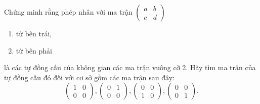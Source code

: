 \begin{exercise}
    Chứng minh rằng phép nhân với ma trận $\begin{pmatrix}a & b \\ c & d\end{pmatrix}$
    \begin{enumerate}[label = (\alph*)]
        \item từ bên trái,
        \item từ bên phải
    \end{enumerate}
    
    là các tự đồng cấu của không gian các ma trận vuông cỡ 2. Hãy tìm ma trận của tự đồng cấu đó đối với cơ sở gồm các ma trận sau đây:
    \[
        \begin{pmatrix}
            1 & 0 \\
            0 & 0
        \end{pmatrix},
        \begin{pmatrix}
            0 & 1 \\
            0 & 0
        \end{pmatrix},
        \begin{pmatrix}
            0 & 0 \\
            1 & 0
        \end{pmatrix},
        \begin{pmatrix}
            0 & 0 \\
            0 & 1
        \end{pmatrix}.
    \]
\end{exercise}

